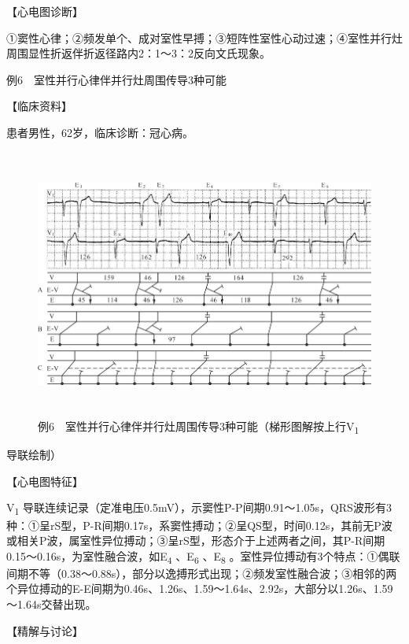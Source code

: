 【心电图诊断】

①窦性心律；②频发单个、成对室性早搏；③短阵性室性心动过速；④室性并行灶周围显性折返伴折返径路内2：1～3：2反向文氏现象。

例6　室性并行心律伴并行灶周围传导3种可能

【临床资料】

患者男性，62岁，临床诊断：冠心病。

\begin{figure}[!htbp]
 \centering
 \includegraphics[width=5.75in,height=3.48958in]{./images/Image00764.jpg}
 \captionsetup{justification=centering}
 \caption{例6　室性并行心律伴并行灶周围传导3种可能（梯形图解按上行V\textsubscript{1}}
 \label{fig50-6}
  \end{figure} 
导联绘制）

【心电图特征】

V\textsubscript{1}
导联连续记录（定准电压0.5mV），示窦性P-P间期0.91～1.05s，QRS波形有3种：①呈rS型，P-R间期0.17s，系窦性搏动；②呈QS型，时间0.12s，其前无P波或相关P波，属室性异位搏动；③呈rS型，形态介于上述两者之间，其P-R间期0.15～0.16s，为室性融合波，如E\textsubscript{4}
、E\textsubscript{6} 、E\textsubscript{8}
。室性异位搏动有3个特点：①偶联间期不等（0.38～0.88s），部分以逸搏形式出现；②频发室性融合波；③相邻的两个异位搏动的E-E间期为0.46s、1.26s、1.59～1.64s、2.92s，大部分以1.26s、1.59～1.64s交替出现。

【精解与讨论】

